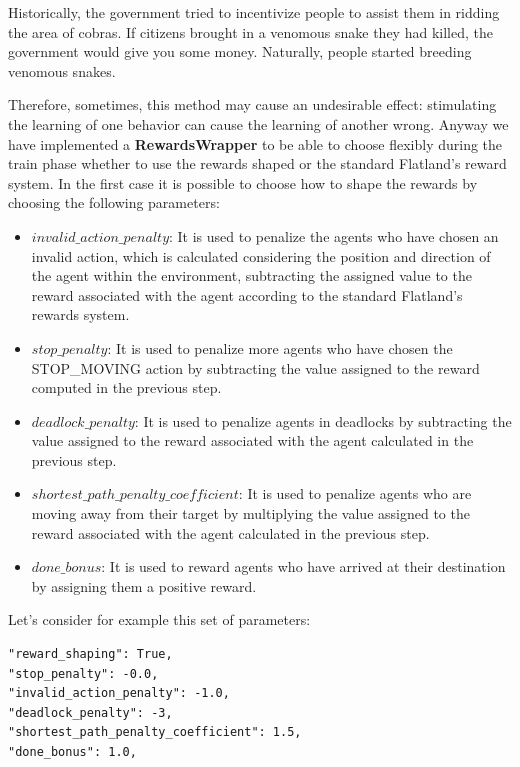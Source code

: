 \documentclass[11pt, a4paper, hidelinks]{report}
\begin{document}
\begin{quoting}[font=itshape, begintext={"}, endtext={ \footnote{https://medium.com/@BonsaiAI/deep-reinforcement-learning-models-tips-tricks-for-writing-reward-functions-a84fe525e8e0}}]
Historically, the government tried to incentivize people to assist them in ridding the area of cobras.
If citizens brought in a venomous snake they had killed, the government would give you some money.
Naturally, people started breeding venomous snakes.
\end{quoting}
Therefore, sometimes, this method may cause an undesirable effect: stimulating the learning of one behavior can cause the learning of another wrong.
Anyway  we have implemented a \textbf{RewardsWrapper} to be able to choose flexibly during the train phase whether to use the rewards shaped or the standard Flatland's reward system.
In the first case it is possible to choose how to shape the rewards by choosing the following parameters:

\begin{itemize}
	\item \textbf{$invalid\_action\_penalty$}: It is used to penalize the agents who have chosen an invalid action, which is calculated considering the position and direction of the agent within the environment, subtracting the assigned value to the reward associated with the agent according to the standard Flatland's rewards system.
	\item \textbf{$stop\_penalty$}: It is used to penalize more agents who have chosen the STOP\_MOVING action by subtracting the value assigned to the reward computed in the previous step.
	\item \textbf{$deadlock\_penalty$}: It is used to penalize agents in deadlocks by subtracting the value assigned to the reward associated with the agent calculated in the previous step.
	\item \textbf{$shortest\_path\_penalty\_coefficient$}: It is used to penalize agents who are moving away from their target by multiplying the value assigned to the reward associated with the agent calculated in the previous step.
	\item \textbf{$done\_bonus$}: It is used to reward agents who have arrived at their destination by assigning them a positive reward.
\end{itemize}
Let's consider for example this set of parameters:

\begin{lstlisting}[label={lst:rewards-params}]
"reward_shaping": True,
"stop_penalty": -0.0,
"invalid_action_penalty": -1.0,
"deadlock_penalty": -3,
"shortest_path_penalty_coefficient": 1.5,
"done_bonus": 1.0,
\end{lstlisting}
\end{document}
